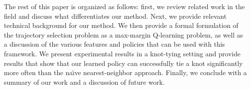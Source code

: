 The rest of this paper is organized as follows: first, we review related work in
the field and discuss what differentiates our method. Next, we provide relevant
technical background for our method. We then provide a formal formulation of the
trajectory selection problem as a max-margin Q-learning problem, as well as a
discussion of the various features and policies that can be used with this
framework. We present experimental results in a knot-tying setting and provide
results that show that our learned policy can successfully tie a knot
significantly more often than the na\"{\i}ve nearest-neighbor approach. Finally,
we conclude with a summary of our work and a discussion of future work.

